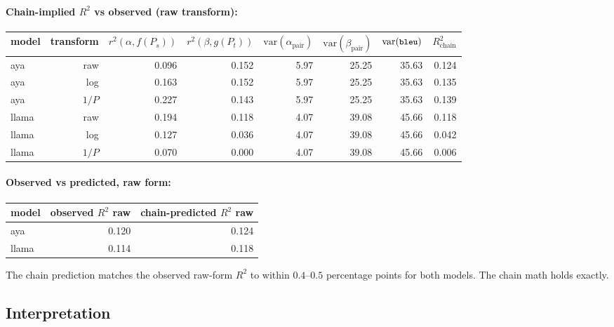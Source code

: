 \documentclass[11pt]{article}
\newcommand{\code}[1]{\texttt{\small #1}}
\begin{document}
\paragraph{Chain-implied $R^2$ vs observed (raw transform):}

\begin{center}
\small
\begin{tabular}{lrrrrrrr}
\toprule
model & transform & $r^2(\alpha, f(P_s))$ & $r^2(\beta, g(P_t))$
      & $\mathrm{var}(\alpha_{\text{pair}})$ & $\mathrm{var}(\beta_{\text{pair}})$
      & $\mathrm{var}(\code{bleu})$ & $R^2_{\text{chain}}$ \\
\midrule
aya   & raw       & 0.096 & 0.152 & 5.97 & 25.25 & 35.63 & 0.124 \\
aya   & log       & 0.163 & 0.152 & 5.97 & 25.25 & 35.63 & 0.135 \\
aya   & $1/P$     & 0.227 & 0.143 & 5.97 & 25.25 & 35.63 & 0.139 \\
llama & raw       & 0.194 & 0.118 & 4.07 & 39.08 & 45.66 & 0.118 \\
llama & log       & 0.127 & 0.036 & 4.07 & 39.08 & 45.66 & 0.042 \\
llama & $1/P$     & 0.070 & 0.000 & 4.07 & 39.08 & 45.66 & 0.006 \\
\bottomrule
\end{tabular}
\end{center}

\paragraph{Observed vs predicted, raw form:}

\begin{center}
\small
\begin{tabular}{lrr}
\toprule
model & observed $R^2$ raw & chain-predicted $R^2$ raw \\
\midrule
aya   & 0.120 & 0.124 \\
llama & 0.114 & 0.118 \\
\bottomrule
\end{tabular}
\end{center}

The chain prediction matches the observed raw-form $R^2$ to within
$0.4$--$0.5$ percentage points for both models. The chain math holds
exactly.

\subsection{Interpretation}
\end{document}

